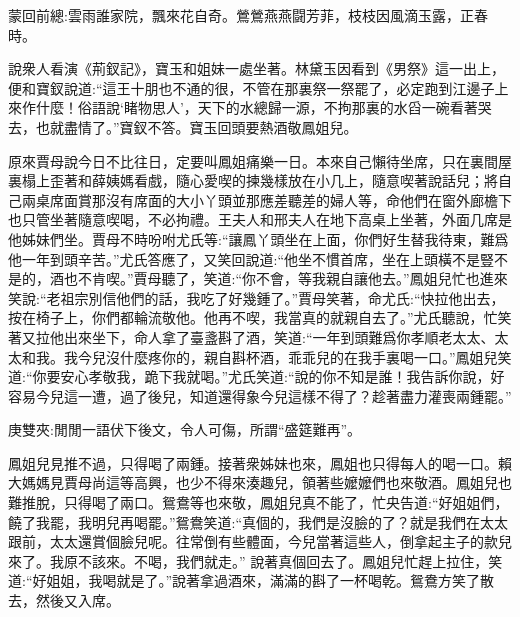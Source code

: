 

\begin{parag}
    \begin{note}蒙回前總:雲雨誰家院，飄來花自奇。鶯鶯燕燕闘芳菲，枝枝因風滴玉露，正春時。\end{note}
\end{parag}


\begin{parag}
    說衆人看演《荊釵記》，寶玉和姐妹一處坐著。林黛玉因看到《男祭》這一出上，便和寶釵說道:“這王十朋也不通的很，不管在那裏祭一祭罷了，必定跑到江邊子上來作什麼！俗語說‘睹物思人’，天下的水總歸一源，不拘那裏的水舀一碗看著哭去，也就盡情了。”寶釵不答。寶玉回頭要熱酒敬鳳姐兒。
\end{parag}


\begin{parag}
    原來賈母說今日不比往日，定要叫鳳姐痛樂一日。本來自己懶待坐席，只在裏間屋裏榻上歪著和薛姨媽看戲，隨心愛喫的揀幾樣放在小几上，隨意喫著說話兒；將自己兩桌席面賞那沒有席面的大小丫頭並那應差聽差的婦人等，命他們在窗外廊檐下也只管坐著隨意喫喝，不必拘禮。王夫人和邢夫人在地下高桌上坐著，外面几席是他姊妹們坐。賈母不時吩咐尤氏等:“讓鳳丫頭坐在上面，你們好生替我待東，難爲他一年到頭辛苦。”尤氏答應了，又笑回說道:“他坐不慣首席，坐在上頭橫不是豎不是的，酒也不肯喫。”賈母聽了，笑道:“你不會，等我親自讓他去。”鳳姐兒忙也進來笑說:“老祖宗別信他們的話，我吃了好幾鍾了。”賈母笑著，命尤氏:“快拉他出去，按在椅子上，你們都輪流敬他。他再不喫，我當真的就親自去了。”尤氏聽說，忙笑著又拉他出來坐下，命人拿了臺盞斟了酒，笑道:“一年到頭難爲你孝順老太太、太太和我。我今兒沒什麼疼你的，親自斟杯酒，乖乖兒的在我手裏喝一口。”鳳姐兒笑道:“你要安心孝敬我，跪下我就喝。”尤氏笑道:“說的你不知是誰！我告訴你說，好容易今兒這一遭，過了後兒，知道還得象今兒這樣不得了？趁著盡力灌喪兩鍾罷。”\begin{note}庚雙夾:閒閒一語伏下後文，令人可傷，所謂“盛筵難再”。\end{note}鳳姐兒見推不過，只得喝了兩鍾。接著衆姊妹也來，鳳姐也只得每人的喝一口。賴大媽媽見賈母尚這等高興，也少不得來湊趣兒，領著些嬤嬤們也來敬酒。鳳姐兒也難推脫，只得喝了兩口。鴛鴦等也來敬，鳳姐兒真不能了，忙央告道:“好姐姐們，饒了我罷，我明兒再喝罷。”鴛鴦笑道:“真個的，我們是沒臉的了？就是我們在太太跟前，太太還賞個臉兒呢。往常倒有些體面，今兒當著這些人，倒拿起主子的款兒來了。我原不該來。不喝，我們就走。” 說著真個回去了。鳳姐兒忙趕上拉住，笑道:“好姐姐，我喝就是了。”說著拿過酒來，滿滿的斟了一杯喝乾。鴛鴦方笑了散去，然後又入席。
\end{parag}


